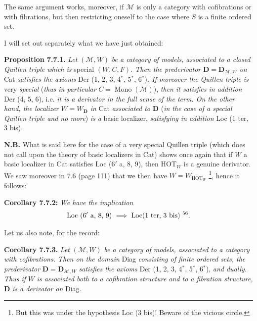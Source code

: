 \documentclass[11pt]{article}
\newcommand{\printedpage}[1]{\marginpar{\footnotesize p.~#1}}
\newcommand{\msp}[1]{\marginpar{\footnotesize [#1]}}
\begin{document}
The same argument works, moreover, if $\mathcal{M}$ is only a category with cofibrations or with fibrations, but then restricting oneself to the case where $S$ is a finite ordered set.

\printedpage{55}
\msp{page 117}
I will set out separately what we have just obtained:

\textbf{Proposition 7.7.1.} \textit{Let} $(\mathcal{M},W)$ \textit{be a category of models, associated to a closed Quillen triple which is} special $(W,C,F)$\textit{. Then the prederivator} $\mathbf{D}=\mathbf{D}_{\mathcal{M},W}$ \textit{on} Cat \textit{satisfies the axioms} Der (1, 2, 3, 4$^*$, 5$^*$, 6$^*$)\textit{. If moreover the Quillen triple is} very \textit{special} (\textit{thus in particular} $C=\operatorname{Mono}(\mathcal{M})$), \textit{then it satisfies in addition} Der (4, 5, 6), i.e. \textit{it is a derivator in the full sense of the term. On the other hand, the localizer} $W=W_{\mathbf{D}}$ \textit{in} Cat \textit{associated to} $\mathbf{D}$ (\textit{in the case of a special Quillen triple and no more}) \textit{is a} basic localizer, \textit{satisfying in addition} Loc (1 ter, 3 bis).

\textbf{N.B.} What is said here for the case of a very special Quillen triple (which does not call upon the theory of basic localizers
\msp{page 118}
in Cat) shows once again that if $W$ a basic localizer in Cat satisfies Loc (6$'$ a, 8, 9), then $\mathrm{HOT}_W$ is a genuine derivator. We saw moreover in 7.6 (page 111) that we then have $W=W_{\mathrm{HOT}_W}$ \footnote[55]{But this was under the hypothesis Loc (3 bis)! Beware of the vicious circle.}, hence it follows:

\textbf{Corollary 7.7.2:} \textit{We have the implication}
\[ \text{Loc } (6'\text{ a, 8, 9})\ \Longrightarrow\ \text{Loc(1 ter, 3 bis)}\ \text{\footnotemark[56]}. \]

Let us also note, for the record:

\textbf{Corollary 7.7.3.} \textit{Let} $(\mathcal{M},W)$ \textit{be a category of models, associated to a category with cofibrations. Then on the domain} Diag \textit{consisting of finite ordered sets, the prederivator} $\mathbf{D}=\mathbf{D}_{\mathcal{M},W}$ \textit{satisfies the axioms} Der (1, 2, 3, 4$^*$, 5$^*$, 6$^*$), \textit{and dually. Thus if} $W$ \textit{is associated both to a cofibration structure and to a fibration structure,} $\mathbf{D}$ \textit{is a derivator on} Diag.
\end{document}
